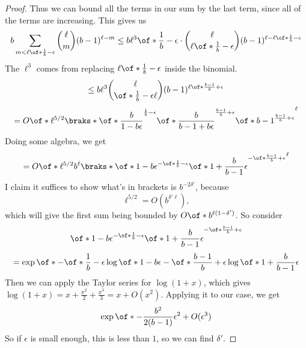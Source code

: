 \documentclass{article}
\begin{document}
\begin{proof}
    Thus we can bound all the terms in our sum by the last term,
    since all of the terms are increasing.
    This gives us 
    \[
        b\sum_{m<\ell\of*{\frac{1}{b}-\epsilon}}
        \binom{\ell}{m} (b-1)^{\ell-m}
        \le b\ell^3 \of*{\frac{1}{b}-\epsilon}
        \cdot \binom{\ell}{\ell \of*{\frac{1}{b}-\epsilon}}
        (b-1)^{\ell - \ell \of*{\frac{1}{b}-\epsilon}}
    \]
    The $\ell^3$ comes from replacing 
    $\ell\of*{\frac{1}{b}-\epsilon}$ inside the binomial.
    \[\le 
    b\ell^3 \binom{\ell}{\of*{\frac{1}{b}-\epsilon}\ell}
    (b-1)^{\ell\of*{\frac{b-1}{b} +\epsilon}}
    \]
    \[
        =O\of*{
            \ell^{5/2}
            \braks*{
                \of*{
                    \frac{b}{1-b\epsilon}
                }^{
                    \frac{1}{b}-\epsilon
                }
                \of*{
                    \frac{b}{
                        b-1+b\epsilon
                    }
                }^{
                    \frac{b-1}{b} + \epsilon
                }
                \of*{
                    b-1
                }^{
                    \frac{b-1}{b} + \epsilon
                }
            }^\ell
        }
    \]
    Doing some algebra, we get
    \[
        =O\of*{
            \ell^{5/2}
            b^\ell
            \braks*{
                \of*{
                    1-b\epsilon
                }^{
                    -\of*{\frac{1}{b}-\epsilon}
                }
                \of*{
                    1+
                    \frac{b}{
                        b-1
                    }
                    \epsilon
                }^{
                    -\of*{\frac{b-1}{b} + \epsilon}
                }
            }^\ell
        }
    \]
    I claim it suffices to show what's in brackets 
    is $b^{-2\delta'}$, because 
    \[ \ell^{5/2} = O(b^{\delta' \ell}),
    \]
    which will give the first sum being bounded 
    by $O\of*{b^{\ell(1-\delta')}}$.
    So consider 
    \[\of*{1-b\epsilon}^{
        -\of*{
            \frac{1}{b}-\epsilon
        }
    }
    \of*{
        1+\frac{b}{b-1}\epsilon
    }^{
        -\of*{\frac{b-1}{b} + \epsilon}
    }
    \]
    \[
    = \exp\of*{
        -\of*{
            \frac{1}{b}-\epsilon
        }
        \log\of*{
            1-b\epsilon
        }
        -
        \of*{
            \frac{b-1}{b} + \epsilon
        }
        \log \of*{
            1+\frac{b}{b-1}\epsilon
        }
    }
    \]
    Then we can apply the Taylor series for $\log (1+x)$,
    which gives $\log(1+x) =x +\frac{x^2}{2}+\frac{x^3}{3}
    =x+O(x^2)$.
    Applying it to our case, we get
    \[\exp\of*{
        -\frac{b^2}{2(b-1)} \epsilon^2 
        +O(\epsilon^3)
    }
    \]
    So if $\epsilon$ is small enough, this is less 
    than $1$, so we can find $\delta'$.


\end{proof}
\end{document}
